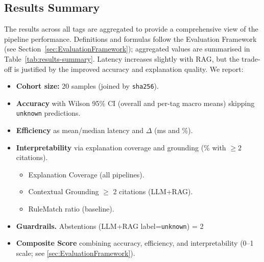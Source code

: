 \subsection{Results Summary}\label{subsec:ResultsSummary}
The results across all tags are aggregated to provide a comprehensive view of the pipeline
performance. Definitions and formulas follow the Evaluation Framework (see
Section~\ref{sec:EvaluationFramework}); aggregated values are summarised in
Table~\ref{tab:results-summary}. Latency increases slightly with RAG, but the trade-off is
justified by the improved accuracy and explanation quality. We report:
\begin{itemize}
      \item \textbf{Cohort size:} 20 samples (joined by \texttt{sha256}).
      \item \textbf{Accuracy} with Wilson 95\% CI (overall and per-tag macro means) skipping \texttt{unknown} predictions.
      \item \textbf{Efficiency} as mean/median latency and $\Delta$ (ms and \%).
      \item \textbf{Interpretability} via explanation coverage and grounding (\% with $\geq 2$ citations).
            \begin{itemize}
                  \item Explanation Coverage (all pipelines).
                  \item Contextual Grounding $\geq$ 2 citations (LLM+RAG).
                  \item RuleMatch ratio (baseline).
            \end{itemize}
      \item \textbf{Guardrails.} Abstentions (LLM+RAG label=\texttt{unknown}) = 2
      \item \textbf{Composite Score} combining accuracy, efficiency, and interpretability (0–1 scale; see \ref{sec:EvaluationFramework}).
\end{itemize}

